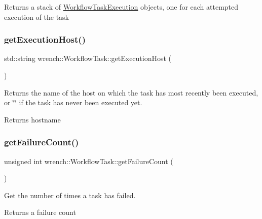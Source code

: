 \begin{DoxyReturn}{Returns}
a stack of \hyperlink{structwrench_1_1_workflow_task_1_1_workflow_task_execution}{Workflow\+Task\+Execution} objects, one for each attempted execution of the task 
\end{DoxyReturn}
\mbox{\label{classwrench_1_1_workflow_task_af166a3b9b4b9d7a62711d3431961cd4f}} 
\subsubsection{\texorpdfstring{get\+Execution\+Host()}{getExecutionHost()}}
{\footnotesize\ttfamily std\+::string wrench\+::\+Workflow\+Task\+::get\+Execution\+Host (\begin{DoxyParamCaption}{ }\end{DoxyParamCaption})}



Returns the name of the host on which the task has most recently been executed, or \char`\"{}\char`\"{} if the task has never been executed yet. 

\begin{DoxyReturn}{Returns}
hostname 
\end{DoxyReturn}
\mbox{\label{classwrench_1_1_workflow_task_a6103d36486855fb8caabb008bcfaacd4}} 
\subsubsection{\texorpdfstring{get\+Failure\+Count()}{getFailureCount()}}
{\footnotesize\ttfamily unsigned int wrench\+::\+Workflow\+Task\+::get\+Failure\+Count (\begin{DoxyParamCaption}{ }\end{DoxyParamCaption})}



Get the number of times a task has failed. 

\begin{DoxyReturn}{Returns}
a failure count 
\end{DoxyReturn}
\mbox{\label{classwrench_1_1_workflow_task_ae96176bb8e0695833b0e4b6034b36857}} 
